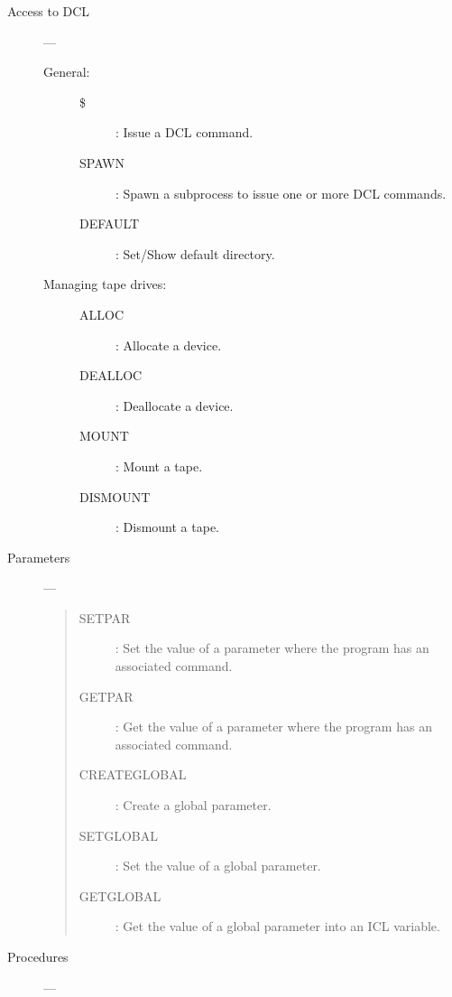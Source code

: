 \begin{description}
\item [Access to DCL] ---

\begin{description}
\item [General:] \mbox{}
\begin{description}
\item[\$] :
 Issue a DCL command.
\item[SPAWN] :
 Spawn a subprocess to issue one or more DCL commands.
\item[DEFAULT] :
 Set/Show default directory.
\end{description}
\item [Managing tape drives:] \mbox{}
\begin{description}
\item[ALLOC] :
 Allocate a device.
\item[DEALLOC] :
 Deallocate a device.
\item[MOUNT] :
 Mount a tape.
\item[DISMOUNT] :
 Dismount a tape.
\end{description}
\end{description}

\item [Parameters] ---

\begin{quote}
\begin{description}
\item[SETPAR] :
 Set the value of a parameter where the program has an associated command.
\item[GETPAR] :
 Get the value of a parameter where the program has an associated command.
\item[CREATEGLOBAL] :
 Create a global parameter.
\item[SETGLOBAL] :
 Set the value of a global parameter.
\item[GETGLOBAL] :
 Get the value of a global parameter into an ICL variable.
\end{description}
\end{quote}

\item [Procedures] ---


\end{description}
